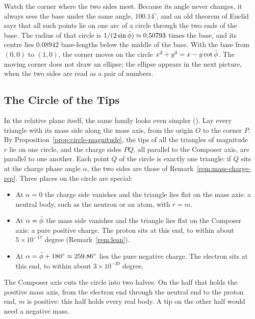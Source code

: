 Watch the corner where the two sides meet. Because its angle never changes, it always sees the base under the same angle, $100.14^\circ$, and an old theorem of Euclid says that all such points lie on one arc of a circle through the two ends of the base. The radius of that circle is $1/(2\sin\bar{\phi}) \approx 0.50793$ times the base, and its centre lies $0.08942$ base-lengths below the middle of the base. With the base from $(0, 0)$ to $(1, 0)$, the corner moves on the circle $x^2 + y^2 = x - y\cot\bar{\phi}$. The moving corner does not draw an ellipse; the ellipse appears in the next picture, when the two sides are read as a pair of numbers.

\subsection{The Circle of the Tips}\label{subsec:sm-tips}

In the relative plane itself, the same family looks even simpler (). Lay every triangle with its mass side along the mass axis, from the origin $O$ to the corner $P$. By Proposition~\ref{prop:circle-magnitude}, the tips of all the triangles of magnitude $r$ lie on one circle, and the charge sides $PQ$, all parallel to the Composer axis, are parallel to one another. Each point $Q$ of the circle is exactly one triangle: if $Q$ sits at the charge phase angle $\alpha$, the two sides are those of Remark~\ref{rem:mass-charge-rep}. Three places on the circle are special:
\begin{itemize}
  \item At $\alpha = 0$ the charge side vanishes and the triangle lies flat on the mass axis: a neutral body, such as the neutron or an atom, with $r = m$.
  \item At $\alpha = \bar{\phi}$ the mass side vanishes and the triangle lies flat on the Composer axis: a pure positive charge. The proton sits at this end, to within about $5 \times 10^{-17}$ degree (Remark~\ref{rem:lean}).
  \item At $\alpha = \bar{\phi} + 180^\circ \approx 259.86^\circ$ lies the pure negative charge. The electron sits at this end, to within about $3 \times 10^{-20}$ degree.
\end{itemize}
The Composer axis cuts the circle into two halves. On the half that holds the positive mass axis, from the electron end through the neutral end to the proton end, $m$ is positive: this half holds every real body. A tip on the other half would need a negative mass.

